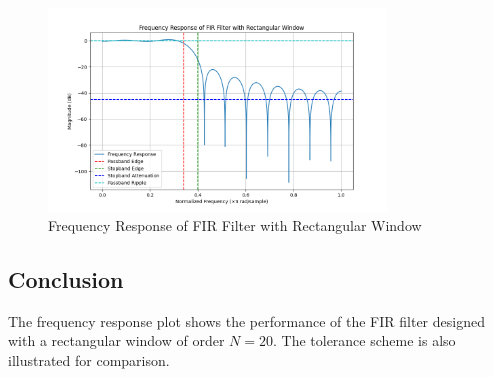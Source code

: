 \begin{figure}[h]
    \centering
    \includegraphics[width=0.8\textwidth]{fig/ex4_e_frequency_response.png}
    \caption{Frequency Response of FIR Filter with Rectangular Window}
    \label{fig:ex4_e_frequency_response}
\end{figure}

\subsection*{Conclusion}
The frequency response plot shows the performance of the FIR filter designed with a rectangular window of order \( N = 20 \). The tolerance scheme is also illustrated for comparison.
